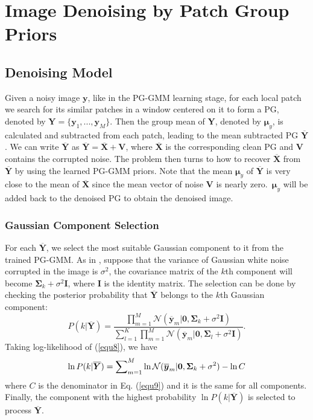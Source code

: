 \section{Image Denoising by Patch Group Priors}
\subsection{Denoising Model}
Given a noisy image $\bm{y}$, like in the PG-GMM learning stage, for each local patch we search for its similar patches in a window centered on it to form a PG, denoted by $\bm{Y} = \{\bm{y}_{1},...,\bm{y}_{M}\}$. Then the group mean of $\bm{Y}$, denoted by $\bm{\mu}_{y}$, is calculated and subtracted from each patch, leading to the mean subtracted PG $\bm{\overline{Y}}$. We can write $\bm{\overline{Y}}$ as $\bm{\overline{Y}}=\bm{\overline{X}}+\bm{V}$, where $\bm{\overline{X}}$ is the corresponding clean PG and $\bm{V}$ contains the corrupted noise. The problem then turns to how to recover $\bm{\overline{X}}$ from $\bm{\overline{Y}}$ by using the learned PG-GMM priors. Note that the mean $\bm{\mu}_{y}$ of $\bm{\overline{Y}}$  is very close to the mean of $\bm{\overline{X}}$ since the mean vector of noise $\bm{V}$ is nearly zero.\ $\bm{\mu}_{y}$ will be added back to the denoised PG to obtain the denoised image. 

\subsubsection{Gaussian Component Selection}
For each $\bm{\overline{Y}}$, we select the most suitable Gaussian component to it from the trained PG-GMM. As in \cite{epll}, suppose that the variance of Gaussian white noise corrupted in the image is $\sigma^{2}$, the covariance matrix of the $k$th component will become $\bm{\Sigma}_{k}+\sigma^{2}\bm{I}$, where $\bm{I}$ is the identity matrix. The selection can be done by checking the posterior probability that $\bm{\overline{Y}}$ belongs to the $k$th Gaussian component:
\begin{equation}\label{equ8}
P(k|\bm{\overline{Y}})=\frac{\prod_{m=1}^{M}\mathcal{N}(\bm{\overline{y}}_{m}|\bm{0},\bm{\Sigma}_{k}+\sigma^{2}\bm{I})}{\sum_{l=1}^{K}\prod_{m=1}^{M}\mathcal{N}(\bm{\overline{y}}_{m}|\bm{0},\bm{\Sigma}_{l}+\sigma^{2}\bm{I})}.
\end{equation}
Taking log-likelihood of (\ref{equ8}), we have
\begin{equation}\label{equ9}
\setlength{\abovedisplayskip}{3pt}
\setlength{\belowdisplayskip}{3pt}
\ln P(k|\bm{\overline{Y}}) = \sum\nolimits_{m=1}^{M}\ln\mathcal{N}(\bm{\overline{y}}_{m}|\bm{0},\bm{\Sigma}_{k}+\sigma^{2})-\ln{C}
\end{equation}
where $C$ is the denominator in Eq. (\ref{equ9}) and it is the same for all components. Finally, the component with the highest probability $\ln P(k|\bm{\overline{Y}})$ is selected to process $\bm{\overline{Y}}$.


